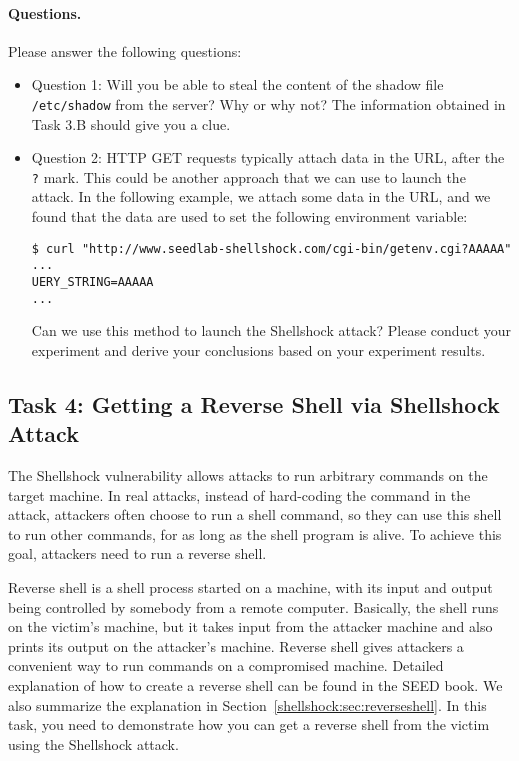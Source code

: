 \paragraph{Questions.} Please answer the following questions:
\begin{itemize}
\item Question 1: Will you be able to steal the content of 
the shadow file \texttt{/etc/shadow} from the server? Why or why not?  
The information obtained in Task 3.B should give you a clue. 

\item Question 2: HTTP GET requests typically attach data in the URL, 
after the \texttt{?} mark. This could be another 
approach that we can use to launch the attack. In the following example,
we attach some data in the URL, and we found that the data are used to set
the following environment variable: 

\begin{lstlisting}
$ curl "http://www.seedlab-shellshock.com/cgi-bin/getenv.cgi?AAAAA"
...
UERY_STRING=AAAAA
...
\end{lstlisting}

Can we use this method to launch the Shellshock attack? Please conduct your 
experiment and derive your conclusions based on your experiment results. 
     
\end{itemize}

  


\subsection{Task 4: Getting a Reverse Shell via Shellshock Attack}

The Shellshock vulnerability allows attacks to run arbitrary commands on
the target machine. In real attacks, instead of hard-coding the command 
in the attack, attackers often choose to run a shell
command, so they can use this shell to run other commands,
for as long as the shell program is alive. 
To achieve this goal, attackers need to run a reverse shell.

Reverse shell is a shell process started on a machine, with its input and output being
controlled by somebody from a remote computer. Basically, the shell runs
on the victim's machine, but it takes input from the attacker machine and
also prints its output on the attacker's machine. Reverse shell
gives attackers a convenient way to run commands on a compromised machine. 
Detailed explanation of how to create a reverse shell can be found in 
the SEED book. We also summarize the explanation in
Section~\ref{shellshock:sec:reverseshell}.
In this task, you need to demonstrate 
how you can get a reverse shell from the victim using the Shellshock attack. 


